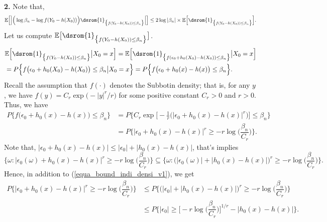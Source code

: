 \documentclass[10pt,twoside]{article}
\numberwithin{equation}{section}
\newcommand{\E}{\ensuremath{\mathbb{E}}}
\def \ind{\textrm{\dsrom{1}}}
\begin{document}
\medskip
\noindent 
\textbf{2.} Note that,
%
%
\begin{align}\label{equa_bound_indi_densi_v0}
    \E\Big[\Big| \Big(\log \beta_n - \log f(Y_0 - h(X_0)) \Big) \ind_{\big\{f(Y_0 - h(X_0)) \leq \beta_n\big\}}\Big|\Big] \leq 2 \log |\beta_n| \times  \E\Big[\ind_{\big\{f(Y_0 - h(X_0)) \leq \beta_n\big\}} \Big]. 
\end{align}
%
Let us compute $\E\big[\ind_{\big\{f(Y_0 - h(X_0)) \leq \beta_n\big\}} \big]$.
%
%
\begin{align}
\nonumber &\E\Big[\ind_{\big\{f(Y_0 - h(X_0)) \leq \beta_n\big\}} \big| X_0 = x\Big]  = \E\Big[\ind_{\big\{f(\epsilon_0 + h_0(X_0) - h(X_0)) \leq \beta_n\big\}} \big| X_0 = x\Big]     
\\
\nonumber & = P\Big\{ f\big(\epsilon_0 + h_0(X_0) - h(X_0) \big) \leq \beta_n  \big| X_0 = x \Big\}
 = P\Big\{ f\big(\epsilon_0 + h_0(x) - h(x) \big) \leq \beta_n \Big\}.
\end{align}
%
Recall the assumption that $f(\cdot)$ denotes the Subbotin density; that is, for any $y$, we have $f(y) = C_r \exp\big(-|y|^r/r \big)$ for some positive constant $C_r > 0$ and $r >0$.
%
Thus, we have
%
\begin{align}\label{equa_bound_indi_densi_v1}
\nonumber P\Big\{ f\big(\epsilon_0 + h_0(x) - h(x) \big) \leq \beta_n \Big\}  & = P\Big\{ C_r \exp\Big[-\frac{1}{r} \Big(\big|\epsilon_0 + h_0(x) - h(x) \big|^r \Big) \Big] \leq \beta_n \Big\}  
\\
 & =  P\Big\{ \big|\epsilon_0 + h_0(x) - h(x) \big|^r \ge -r\log \Big(\dfrac{\beta_n}{C_r} \Big) \Big\}.  
\end{align}
%
%
Note that, $ \big|\epsilon_0 + h_0(x) - h(x) \big| \leq  \big|\epsilon_0 \big| + \big|h_0(x) - h(x) \big|$, that's implies 
%
\[\Big\{\omega: \big|\epsilon_0(\omega) + h_0(x) - h(x) \big|^r \ge  -r\log \Big(\dfrac{\beta_n}{C_r} \Big) \Big\} \subseteq \Big\{\omega: \Big(\big|\epsilon_0(\omega)\big| + \big|h_0(x) - h(x) \big| \Big)^r \ge  -r\log \Big(\dfrac{\beta_n}{C_r} \Big) \Big\}.
\]
Hence, in addition to (\ref{equa_bound_indi_densi_v1}), we get
%
%
\begin{align}
\nonumber  P\Big\{ \big|\epsilon_0 + h_0(x) - h(x) \big|^r \ge -r\log \Big(\dfrac{\beta_n}{C_r} \Big) \Big\} & \leq    P\Big\{\Big(\big|\epsilon_0\big| + \big|h_0(x) - h(x) \big| \Big)^r \ge  -r\log \Big(\dfrac{\beta_n}{C_r} \Big) \Big\}
\\
& \leq  P\Big\{\big|\epsilon_0\big| \ge  \Big[-r\log \Big(\dfrac{\beta_n}{C_r} \Big) \Big]^{1/r} - \big|h_0(x) - h(x) \big| \Big\}.
\end{align}
\end{document}
